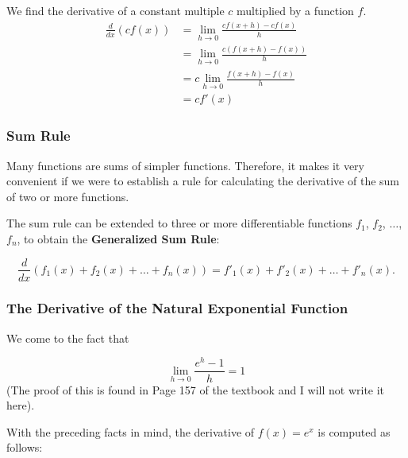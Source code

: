 \documentclass{report}
\begin{document}
We find the derivative of a constant multiple $c$ multiplied by a function $f$. 
\begin{align*}
        \frac{d}{dx}(cf(x)) & = \lim_{h \to 0 } \frac{cf(x+h) - cf(x)}{h} \\
        &= \lim_{h \to 0 } \frac{c(f(x+h) - f(x))}{h} \\
        &= c\lim_{h \to 0 } \frac{f(x+h) - f(x)}{h} \\
        & = cf'(x)
\end{align*}


\subsubsection{Sum Rule}
Many functions are sums of simpler functions. Therefore, it makes it very convenient if we were to establish  a rule for calculating the derivative of the sum of two or more functions. 


The sum rule can be extended to three or more differentiable functions $f_1$, $f_2$, $\ldots$, $f_n$, to obtain the \textbf{Generalized Sum Rule}:

\begin{equation*}
    \frac{d}{dx} (f_1(x) + f_2(x) + \ldots + f_n(x)) =  f'_1(x) + f'_2(x) + \ldots + f'_n(x).
\end{equation*}

\subsubsection{The Derivative of the Natural Exponential Function}
We come to the fact that

\begin{equation*}
    \lim_{h \to 0} \frac{e^h - 1}{h}= 1
\end{equation*}
(The proof of this is found in Page 157 of the textbook and I will not write it here).

With the preceding facts in mind, the derivative of $f(x) = e^x$ is computed as follows:
\end{document}
